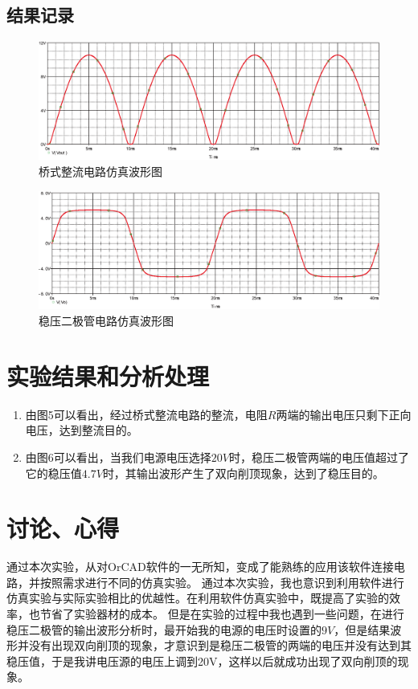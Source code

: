 \documentclass{../source/Experiment}
\begin{document}
            \subsection{结果记录}
                \begin{figure}[h]
                    \centering
                    \includegraphics[scale=0.5]{pic/桥式与稳压二极管/brg3.png}
                    \caption{桥式整流电路仿真波形图}
                \end{figure}
                \newpage
                \begin{figure}[h]
                    \centering
                    \includegraphics[scale=0.5]{pic/桥式与稳压二极管/d3.png}
                    \caption{稳压二极管电路仿真波形图}
                \end{figure}
    \section{实验结果和分析处理}
        \begin{enumerate}
            \item 由图5可以看出，经过桥式整流电路的整流，电阻$R$两端的输出电压只剩下正向电压，达到整流目的。
            \item 由图6可以看出，当我们电源电压选择$20V$时，稳压二极管两端的电压值超过了它的稳压值$4.7V$时，其输出波形产生了双向削顶现象，达到了稳压目的。
        \end{enumerate}
    \section{讨论、心得}
        通过本次实验，从对OrCAD软件的一无所知，变成了能熟练的应用该软件连接电路，并按照需求进行不同的仿真实验。
        通过本次实验，我也意识到利用软件进行仿真实验与实际实验相比的优越性。在利用软件仿真实验中，既提高了实验的效率，也节省了实验器材的成本。
        但是在实验的过程中我也遇到一些问题，在进行稳压二极管的输出波形分析时，最开始我的电源的电压时设置的$9V$，但是结果波形并没有出现双向削顶的现象，才意识到是稳压二极管的两端的电压并没有达到其稳压值，于是我讲电压源的电压上调到20V，这样以后就成功出现了双向削顶的现象。
\end{document}
